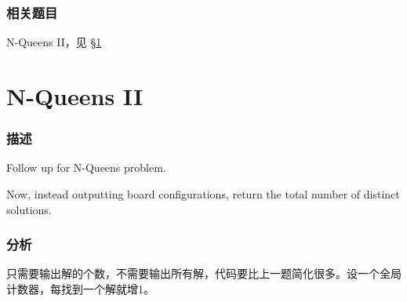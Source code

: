 \subsubsection{相关题目}
\begindot
\item N-Queens II，见 \S \ref{sec:n-queens-ii}
\myenddot


\section{N-Queens II} %
\label{sec:n-queens-ii}


\subsubsection{描述}
Follow up for N-Queens problem.

Now, instead outputting board configurations, return the total number of distinct solutions.


\subsubsection{分析}
只需要输出解的个数，不需要输出所有解，代码要比上一题简化很多。设一个全局计数器，每找到一个解就增1。


